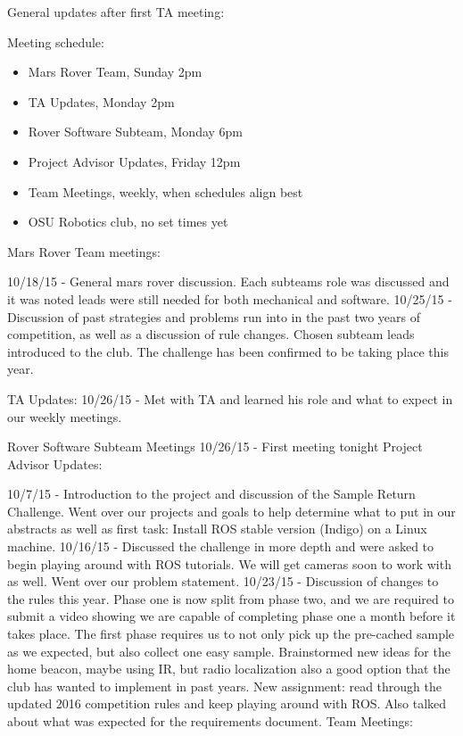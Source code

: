 \documentclass[10pt, oneside,onecolumn]{IEEEtran}
\begin{document}
General updates after first TA meeting:

Meeting schedule:
\begin{itemize}
\item Mars Rover Team, Sunday 2pm
\item TA Updates, Monday 2pm
\item Rover Software Subteam, Monday 6pm
\item Project Advisor Updates, Friday 12pm
\item Team Meetings, weekly, when schedules align best
\item OSU Robotics club, no set times yet
\end{itemize}

Mars Rover Team meetings:

10/18/15 - General mars rover discussion. Each subteams role was discussed and it was noted leads were still needed for both mechanical and software.
10/25/15 - Discussion of past strategies and problems run into in the past two years of competition, as well as a discussion of rule changes. Chosen subteam leads introduced to the club. The challenge has been confirmed to be taking place this year.

TA Updates:
10/26/15 - Met with TA and learned his role and what to expect in our weekly meetings.

Rover Software Subteam Meetings
10/26/15 - First meeting tonight
Project Advisor Updates: 

10/7/15 - Introduction to the project and discussion of the Sample Return Challenge. Went over our projects and goals to help determine what to put in our abstracts as well as first task: Install ROS stable version (Indigo) on a Linux machine.
 10/16/15 - Discussed the challenge in more depth and were asked to begin playing around with ROS tutorials. We will get cameras soon to work with as well. Went over our problem statement.
10/23/15 - Discussion of changes to the rules this year. Phase one is now split from phase two, and we are required to submit a video showing we are capable of completing phase one a month before it takes place. The first phase requires us to not only pick up the pre-cached sample as we expected, but also collect one easy sample. Brainstormed new ideas for the home beacon, maybe using IR, but radio localization also a good option that the club has wanted to implement in past years. New assignment: read through the updated 2016 competition rules and keep playing around with ROS. Also talked about what was expected for the requirements document.
Team Meetings:
\end{document}
